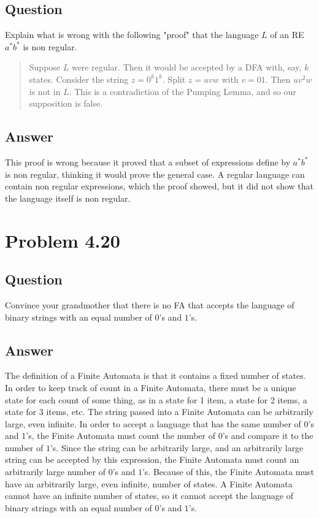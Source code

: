 \documentclass[12pt, a4paper]{article}
\begin{document}
\subsection{Question}
Explain what is wrong with the following "proof" that the language $L$ of an RE $a^{*}b^{*}$ is non regular.

\begin{quotation}
Suppose $L$ were regular. Then it would be accepted by a DFA with, say, $k$ states. Consider the string $z=0^{k}1^{k}$. Split $z=uvw$ with $v=01$. Then $uv^{2}w$ is not in $L$. This is a contradiction of the Pumping Lemma, and so our supposition is false.
\end{quotation}
\subsection{Answer}
This proof is wrong because it proved that a subset of expressions define by $a^{*}b^{*}$ is non regular, thinking it would prove the general case. A regular language can contain non regular expressions, which the proof showed, but it did not show that the language itself is non regular.

\section{Problem 4.20}
\subsection{Question}
Convince your grandmother that there is no FA that accepts the language of binary strings with an equal number of $0$'s and $1$'s.
\subsection{Answer}
The definition of a Finite Automata is that it contains a fixed number of states.
In order to keep track of count in a Finite Automata, there must be a unique state for each count of some thing, as in a state for 1 item, a state for 2 items, a state for 3 items, etc.
The string passed into a Finite Automata can be arbitrarily large, even infinite.
In order to accept a language that has the same number of $0$'s and $1$'s, the Finite Automata must count the number of $0$'s and compare it to the number of $1$'s.
Since the string can be arbitrarily large, and an arbitrarily large string can be accepted by this expression, the Finite Automata must count an arbitrarily large number of $0$'s and $1$'s.
Because of this, the Finite Automata must have an arbitrarily large, even infinite, number of states.
A Finite Automata cannot have an infinite number of states, so it cannot accept the language of binary strings with an equal number of $0$'s and $1$'s.
\end{document}
